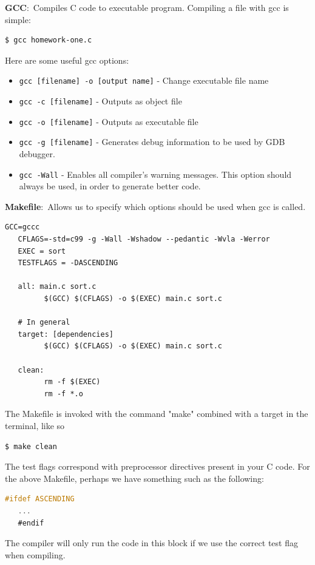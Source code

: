 \documentclass[nobib]{tufte-handout}
\newcommand{\defn}[2]{\noindent\textbf{#1}:\ #2}
\begin{document}
\defn{GCC}{Compiles C code to executable program.}
Compiling a file with gcc is simple:
\begin{lstlisting}[language=bash,caption=Using gcc]
   $ gcc homework-one.c
\end{lstlisting}
Here are some useful gcc options:
\begin{itemize}
   \item \texttt{gcc [filename] -o [output name]} - Change executable file name
   \item \texttt{gcc -c [filename]} - Outputs as object file
   \item \texttt{gcc -o [filename]} - Outputs as executable file
   \item \texttt{gcc -g [filename]} - Generates debug information to be used by GDB debugger.
   \item \texttt{gcc -Wall} - Enables all compiler's warning messages. This option should always be used, in order to generate better code.
\end{itemize}

\defn{Makefile}{Allows us to specify which options should be
used when gcc is called.}
\begin{lstlisting}[caption=Makefile]
   GCC=gccc
   CFLAGS=-std=c99 -g -Wall -Wshadow --pedantic -Wvla -Werror
   EXEC = sort
   TESTFLAGS = -DASCENDING

   all: main.c sort.c
         $(GCC) $(CFLAGS) -o $(EXEC) main.c sort.c

   # In general
   target: [dependencies]
         $(GCC) $(CFLAGS) -o $(EXEC) main.c sort.c

   clean:
         rm -f $(EXEC)
         rm -f *.o
\end{lstlisting}
The Makefile is invoked with the command "make" 
combined with a target in the terminal, like so
\begin{lstlisting}[caption=make clean]
   $ make clean
\end{lstlisting}
The test flags correspond with preprocessor directives present in 
your C code. For the above Makefile, perhaps we have something
such as the following:
\begin{lstlisting}[language=C,caption=Conditional compilation]
   #ifdef ASCENDING
   ...
   #endif
\end{lstlisting}
The compiler will only run the code in this block if we use
the correct test flag when compiling. 
\end{document}
